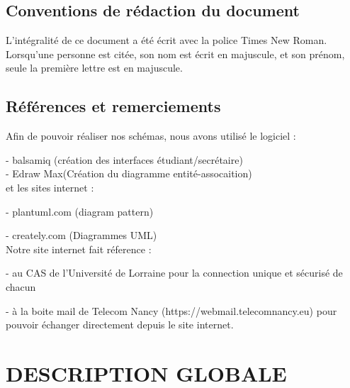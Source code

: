 \documentclass{scrreprt}
\begin{document}
\section{Conventions de rédaction du document}

\hspace{1cm}L'intégralité de ce document a été écrit avec la police Times New Roman.\\

\hspace{0.6cm}Lorsqu'une personne est citée, son nom est écrit en majuscule, et son prénom, seule la première lettre est en majuscule.

\section{Références et remerciements}
\hspace{1cm}Afin de pouvoir réaliser nos schémas, nous avons utilisé le logiciel : 

\hspace{1cm}- balsamiq (création des interfaces étudiant/secrétaire) \\

\hspace{1cm}- Edraw Max(Création du diagramme entité-assocaition) \\

\hspace{0.6cm}et les sites internet :

\hspace{1cm}- plantuml.com (diagram pattern)

\hspace{1cm}- creately.com (Diagrammes UML)\\

\hspace{0.6cm}Notre site internet fait réference :

\hspace{1cm}- au CAS de l'Université de Lorraine pour la connection unique et sécurisé de chacun

\hspace{1cm}- à la boite mail de Telecom Nancy (https://webmail.telecomnancy.eu) pour pouvoir échanger directement depuis le site internet.\\
	

\chapter{DESCRIPTION GLOBALE }
\end{document}
